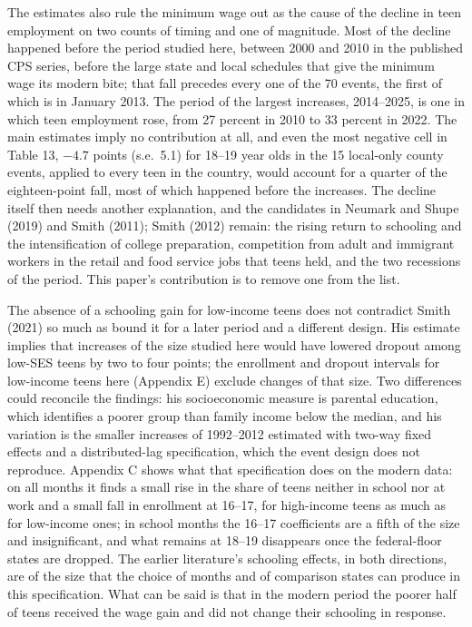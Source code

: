 \documentclass[12pt]{article}
\begin{document}
The estimates also rule the minimum wage out as the cause of the decline in teen employment on two counts of timing and one of magnitude. Most of the decline happened before the period studied here, between 2000 and 2010 in the published CPS series, before the large state and local schedules that give the minimum wage its modern bite; that fall precedes every one of the 70 events, the first of which is in January 2013. The period of the largest increases, 2014--2025, is one in which teen employment rose, from 27 percent in 2010 to 33 percent in 2022. The main estimates imply no contribution at all, and even the most negative cell in Table 13, $-4.7$ points (s.e.\ 5.1) for 18--19 year olds in the 15 local-only county events, applied to every teen in the country, would account for a quarter of the eighteen-point fall, most of which happened before the increases. The decline itself then needs another explanation, and the candidates in Neumark and Shupe (2019) and Smith (2011); Smith (2012) remain: the rising return to schooling and the intensification of college preparation, competition from adult and immigrant workers in the retail and food service jobs that teens held, and the two recessions of the period. This paper's contribution is to remove one from the list.

The absence of a schooling gain for low-income teens does not contradict Smith (2021) so much as bound it for a later period and a different design. His estimate implies that increases of the size studied here would have lowered dropout among low-SES teens by two to four points; the enrollment and dropout intervals for low-income teens here (Appendix E) exclude changes of that size. Two differences could reconcile the findings: his socioeconomic measure is parental education, which identifies a poorer group than family income below the median, and his variation is the smaller increases of 1992--2012 estimated with two-way fixed effects and a distributed-lag specification, which the event design does not reproduce. Appendix C shows what that specification does on the modern data: on all months it finds a small rise in the share of teens neither in school nor at work and a small fall in enrollment at 16--17, for high-income teens as much as for low-income ones; in school months the 16--17 coefficients are a fifth of the size and insignificant, and what remains at 18--19 disappears once the federal-floor states are dropped. The earlier literature's schooling effects, in both directions, are of the size that the choice of months and of comparison states can produce in this specification. What can be said is that in the modern period the poorer half of teens received the wage gain and did not change their schooling in response.
\end{document}
